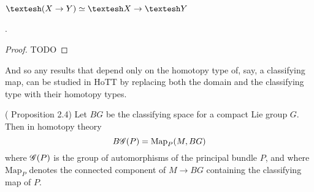 \documentclass[12pt]{article}
\begin{document}
\begin{mylemma} \( \shape(X\to Y)\simeq \shape X\to \shape Y \)\end{mylemma}.
\begin{proof}
TODO
\end{proof}

And so any results that depend only on the homotopy type of, say, a classifying map, can be studied in HoTT by replacing both the domain and the classifying type with their homotopy types.

\begin{myprop}(\cite{atiyah1983yang} Proposition 2.4)
  Let \( BG \) be the classifying space for a compact Lie group \( G \). Then in homotopy theory 
  \[ 
    B\mathscr{G}(P)=\mathrm{Map}_P(M, BG) 
  \]
  where \( \mathscr{G}(P) \) is the group of automorphisms of the principal bundle \( P \), and where \( \mathrm{Map}_P \) denotes the connected component of \( M\to BG \) containing the classifying map of \( P \).
\end{myprop}


\end{document}
